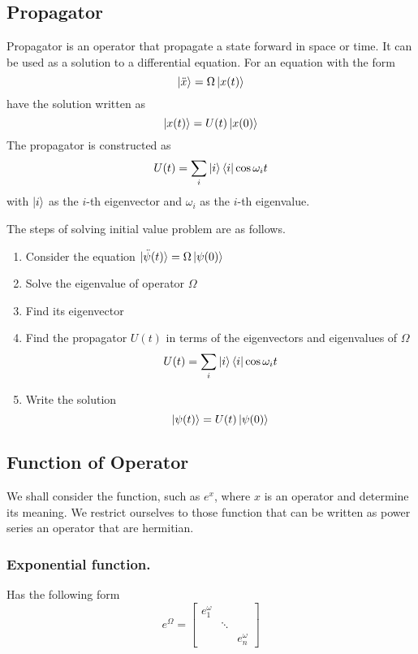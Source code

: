 \documentclass[../main.tex]{subfiles}
\begin{document}
\subsection*{Propagator}
Propagator is an operator that propagate a state forward in space or time.
It can be used as a solution to a differential equation.
For an equation with the form
\begin{equation*}
	\ket{\ddot{x}}=\Omega \ket{x(t)}
\end{equation*}
have the solution written as
\begin{equation*}
	\ket{x(t)}=U(t)\ket{x(0)}
\end{equation*}
The propagator is constructed as
\begin{equation*}
	U(t)= \sum_i\ket{i} \bra{i}\cos \omega_i t
\end{equation*}
with $\ket{i }$ as the $i$-th eigenvector and $\omega_i$ as the $i$-th eigenvalue.

The steps of solving initial value problem are as follows.
\begin{enumerate}
	\item Consider the equation $\ket{\ddot{\psi}(t)}=\Omega\ket{\psi(0)}$
	\item Solve the eigenvalue of operator $\Omega$
	\item Find its eigenvector
	\item Find the propagator $U(t)$ in terms of the eigenvectors and eigenvalues
	      of $\Omega$
	      \begin{equation*}
		      U(t)= \sum_i\ket{i} \bra{i}\cos \omega_i t
	      \end{equation*}
	\item Write the solution
	      \begin{equation*}
		      \ket{\psi(t)}=U(t)\ket{\psi(0)}
	      \end{equation*}
\end{enumerate}

\subsection*{Function of Operator}
We shall consider the function, such as $e^x$, where $x$ is an operator and determine its meaning.
We restrict ourselves to those function that can be written as power series an operator that are hermitian.

\subsubsection*{Exponential function.}
Has the following form
\begin{equation*}
	e^\Omega=
	\begin{bmatrix}
		e^\omega_1 &        &            \\
		           & \ddots &            \\
		           &        & e^\omega_n
	\end{bmatrix}
\end{equation*}
\end{document}
